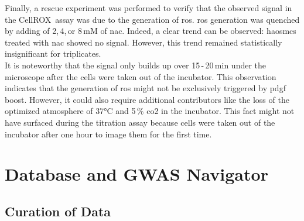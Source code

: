 Finally, a rescue experiment was performed to verify that the observed signal in the CellROX\texttrademark~assay was due to the generation of \ac{ros}. \ac{ros} generation was quenched by adding of 2,\,4,\,or 8\,mM of \ac{nac}. Indeed, a clear trend can be observed: \acp{haosmc} treated with \ac{nac} showed no signal. However, this trend remained statistically insignificant for triplicates.\\
It is noteworthy that the signal only builds up over 15\,-\,20\,min under the microscope after the cells were taken out of the incubator. This observation indicates that the generation of \ac{ros} might not be exclusively triggered by \ac{pdgf} boost. However, it could also require additional contributors like the loss of the optimized atmosphere of 37°C and 5\,\% \ac{co2} in the incubator. This fact might not have surfaced during the titration assay because cells were taken out of the incubator after one hour to image them for the first time.

\section{Database and GWAS Navigator}

    \subsection{Curation of Data}

